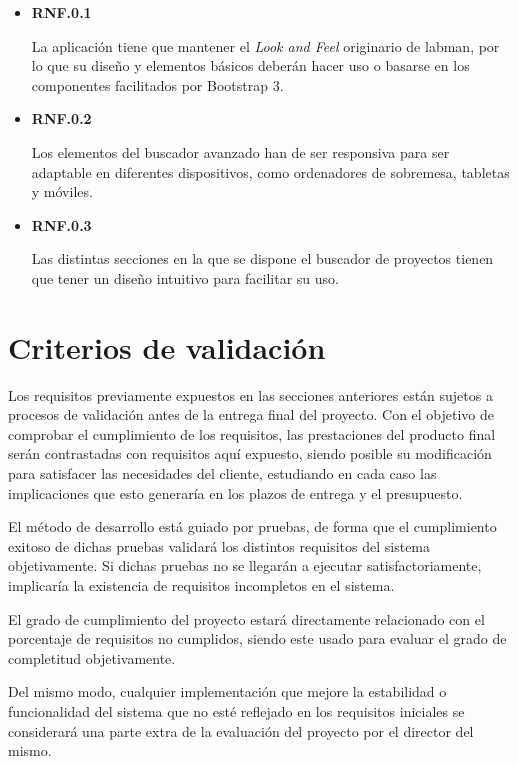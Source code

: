 \begin{itemize}
	\item \textbf{RNF.0.1}

	La aplicación tiene que mantener el \textit{Look and Feel} originario de \acrshort{labman}, por lo que su diseño y elementos básicos deberán hacer uso o basarse en los componentes facilitados por Bootstrap 3.

	\item \textbf{RNF.0.2}

	Los elementos del buscador avanzado han de ser responsiva para ser adaptable en diferentes dispositivos, como ordenadores de sobremesa, tabletas y móviles.

	\item \textbf{RNF.0.3}

	Las distintas secciones en la que se dispone el buscador de proyectos tienen que tener un diseño intuitivo para facilitar su uso.
\end{itemize}


\section{Criterios de validación}

Los requisitos previamente expuestos en las secciones anteriores están sujetos a procesos de validación antes de la entrega final del proyecto. Con el objetivo de comprobar el cumplimiento de los requisitos, las prestaciones del producto final serán contrastadas con requisitos aquí expuesto, siendo posible su modificación para satisfacer las necesidades del cliente, estudiando en cada caso las implicaciones que esto generaría en los plazos de entrega y el presupuesto. 

El método de desarrollo está guiado por pruebas, de forma que el cumplimiento exitoso de dichas pruebas validará los distintos requisitos del sistema objetivamente. Si dichas pruebas no se llegarán a ejecutar satisfactoriamente, implicaría la existencia de requisitos incompletos en el sistema.

El grado de cumplimiento del proyecto estará directamente relacionado con el porcentaje de requisitos no cumplidos, siendo este usado para evaluar el grado de completitud objetivamente.

Del mismo modo, cualquier implementación que mejore la estabilidad o funcionalidad del sistema que no esté reflejado en los requisitos iniciales se considerará una parte extra de la evaluación del proyecto por el director del mismo.
